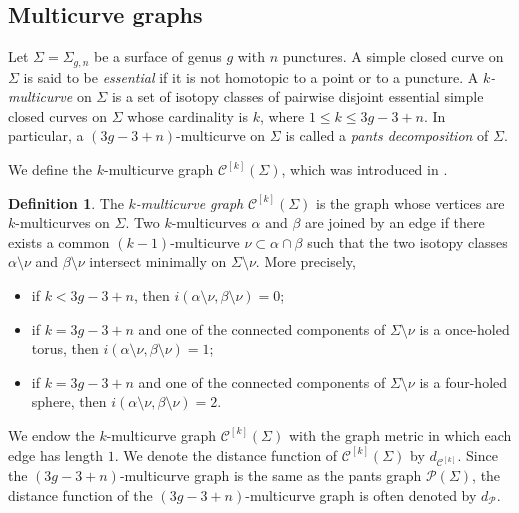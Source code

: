 \documentclass[a4paper,11pt]{amsart}
\numberwithin{equation}{section}
\theoremstyle{definition}
\newtheorem{definition}[theorem]{Definition}
\newcommand{\multicurve}[1]{\mathcal{C}^{[#1]}}
\begin{document}
\subsection{Multicurve graphs}

Let $\Sigma = \Sigma_{g,n}$ be a surface of genus $g$ with $n$ punctures.
A simple closed curve on $\Sigma$ is said to be \emph{essential} if it is not homotopic to a point or to a puncture.
A \emph{$k$-multicurve} on $\Sigma$ is a set of isotopy classes of pairwise disjoint essential simple closed curves on $\Sigma$ whose cardinality is $k$, where $1 \le k \le 3g-3+n$.
In particular, a $(3g-3+n)$-multicurve on $\Sigma$ is called a \emph{pants decomposition} of $\Sigma$.

We define the $k$-multicurve graph $\multicurve{k}(\Sigma)$, which was introduced in \cite{erlandsson2017multicurve}.

\begin{definition}\label{definition:k-multicurve}
    The \emph{$k$-multicurve graph} $\multicurve{k}(\Sigma)$ is the graph whose vertices are $k$-multicurves on $\Sigma$.
    Two $k$-multicurves $\alpha$ and $\beta$ are joined by an edge if there exists a common $(k-1)$-multicurve $\nu \subset \alpha \cap \beta$ such that the two isotopy classes $\alpha \setminus \nu$ and $\beta \setminus \nu$ intersect minimally on $\Sigma \setminus \nu$.
    More precisely,
    \begin{itemize}
        \item if $k < 3g-3+n$, then $i(\alpha \setminus \nu, \beta \setminus \nu) = 0$;
        \item if $k = 3g-3+n$ and one of the connected components of
        $\Sigma \setminus \nu$ is a once-holed torus, then
        $i(\alpha \setminus \nu, \beta \setminus \nu) = 1$;
        \item if $k = 3g-3+n$ and one of the connected components of
        $\Sigma \setminus \nu$ is a four-holed sphere, then
        $i(\alpha \setminus \nu, \beta \setminus \nu) = 2$.
    \end{itemize}
\end{definition}

We endow the $k$-multicurve graph $\multicurve{k}(\Sigma)$ with the graph metric in which each edge has length $1$.
We denote the distance function of $\multicurve{k}(\Sigma)$ by $d_{\multicurve{k}}$.
Since the $(3g-3+n)$-multicurve graph is the same as the pants graph $\mathcal{P}(\Sigma)$,
the distance function of the $(3g-3+n)$-multicurve graph is often denoted by $d_{\mathcal{P}}$. 
\end{document}
